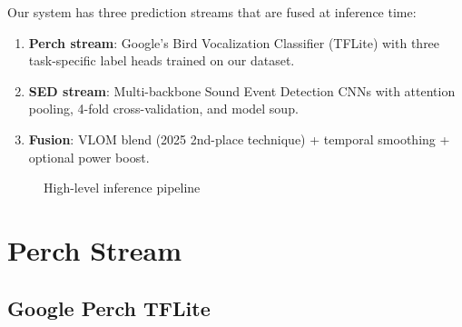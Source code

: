 \documentclass[11pt,a4paper]{article}
\begin{document}
Our system has three prediction streams that are fused at inference time:

\begin{enumerate}[leftmargin=1.5em]
\item \textbf{Perch stream}: Google's Bird Vocalization Classifier (TFLite) with three
  task-specific label heads trained on our dataset.
\item \textbf{SED stream}: Multi-backbone Sound Event Detection CNNs with attention
  pooling, 4-fold cross-validation, and model soup.
\item \textbf{Fusion}: VLOM blend (2025 2nd-place technique) + temporal smoothing
  + optional power boost.
\end{enumerate}

\begin{figure}[H]
\centering
{}
\caption{High-level inference pipeline}
\end{figure}

\section{Perch Stream}
\label{sec:perch}

\subsection{Google Perch TFLite}
\end{document}
